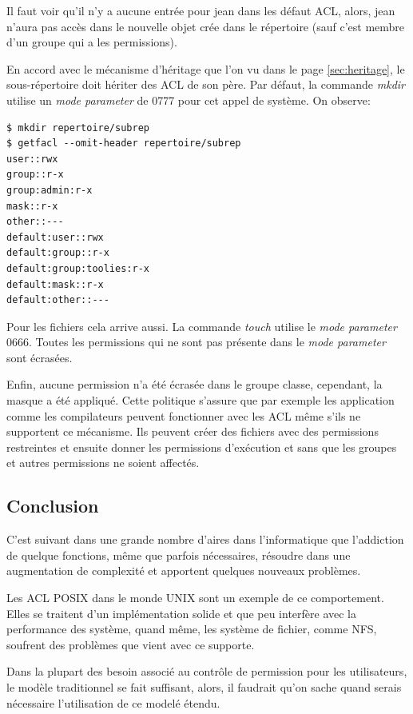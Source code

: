 \documentclass{article}
\begin{document}
Il faut voir qu'il n'y a aucune entrée pour jean dans les défaut ACL, alors, jean n'aura pas accès dans le nouvelle objet crée dans le répertoire (sauf c'est membre d'un groupe qui a les permissions). 

En accord avec le mécanisme d'héritage que l'on vu dans le page \ref{sec:heritage}, le sous-répertoire doit hériter des ACL de son père. Par défaut, la commande \emph{mkdir} utilise un \emph{mode parameter} de 0777 pour cet appel de système. On observe:

\begin{verbatim}
$ mkdir repertoire/subrep 
$ getfacl --omit-header repertoire/subrep 
user::rwx 
group::r-x 
group:admin:r-x 
mask::r-x 
other::--- 
default:user::rwx 
default:group::r-x 
default:group:toolies:r-x 
default:mask::r-x 
default:other::---
\end{verbatim}

Pour les fichiers cela arrive aussi. La commande \emph{touch} utilise le \emph{mode parameter} 0666. Toutes les permissions qui ne sont pas présente dans le \emph{mode parameter} sont écrasées.

Enfin, aucune permission n'a été écrasée dans le groupe classe, cependant, la masque a été appliqué. Cette politique s'assure que par exemple les application comme les compilateurs peuvent fonctionner avec les ACL même s'ils ne supportent ce mécanisme. Ils peuvent créer des fichiers avec des permissions restreintes et ensuite donner les permissions d'exécution et sans que les groupes et autres permissions ne soient affectés.

\subsection*{Conclusion}
C'est suivant dans une grande nombre d'aires dans l'informatique que l'addiction de quelque fonctions, même que parfois nécessaires, résoudre dans une augmentation de complexité et apportent quelques nouveaux problèmes. 

Les ACL POSIX dans le monde UNIX sont un exemple de ce comportement. Elles se traitent d'un implémentation solide et que peu interfère avec la performance des système, quand même, les système de fichier, comme NFS, soufrent des problèmes que vient avec ce supporte.

Dans la plupart des besoin associé au contrôle de permission pour les utilisateurs, le modèle traditionnel se fait suffisant, alors, il faudrait qu'on sache quand serais nécessaire l'utilisation de ce modelé étendu. 
\end{document}
